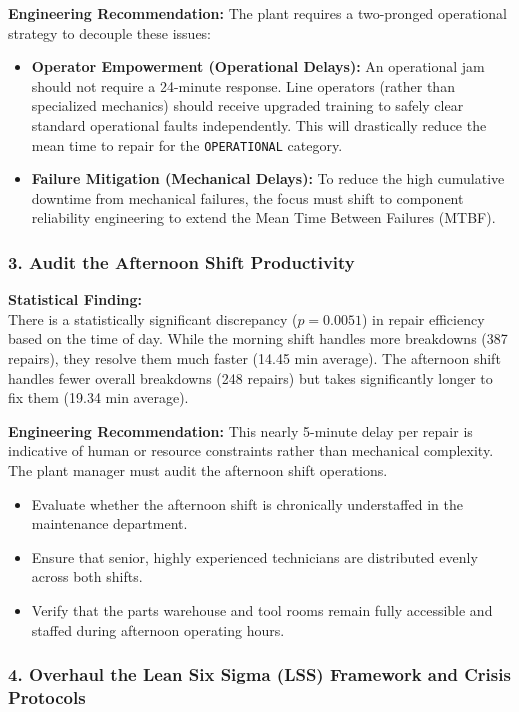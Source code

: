 \textbf{Engineering Recommendation:}
The plant requires a two-pronged operational strategy to decouple these issues:
\begin{itemize}
    \item \textbf{Operator Empowerment (Operational Delays):} An operational jam should not require a 24-minute response. Line operators (rather than specialized mechanics) should receive upgraded training to safely clear standard operational faults independently. This will drastically reduce the mean time to repair for the \texttt{OPERATIONAL} category.
    \item \textbf{Failure Mitigation (Mechanical Delays):} To reduce the high cumulative downtime from mechanical failures, the focus must shift to component reliability engineering to extend the Mean Time Between Failures (MTBF).
\end{itemize}

\subsubsection*{3. Audit the Afternoon Shift Productivity}

\textbf{Statistical Finding:}\\
There is a statistically significant discrepancy ($p = 0.0051$) in repair efficiency based on the time of day. While the morning shift handles more breakdowns (387 repairs), they resolve them much faster (14.45 min average). The afternoon shift handles fewer overall breakdowns (248 repairs) but takes significantly longer to fix them (19.34 min average).

\textbf{Engineering Recommendation:}
This nearly 5-minute delay per repair is indicative of human or resource constraints rather than mechanical complexity. The plant manager must audit the afternoon shift operations.
\begin{itemize}
    \item Evaluate whether the afternoon shift is chronically understaffed in the maintenance department.
    \item Ensure that senior, highly experienced technicians are distributed evenly across both shifts.
    \item Verify that the parts warehouse and tool rooms remain fully accessible and staffed during afternoon operating hours.
\end{itemize}

\subsubsection*{4. Overhaul the Lean Six Sigma (LSS) Framework and Crisis Protocols}

